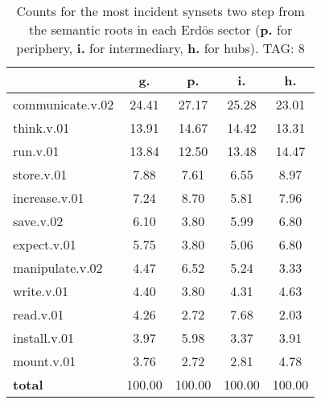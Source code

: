 \begin{table}[h!]
\begin{center}
\begin{tabular}{| l || c | c | c | c |}\hline
 & {\bf g.} & {\bf p.} & {\bf i.} & {\bf h.} \\\hline\hline
communicate.v.02 & 24.41  & 27.17  & 25.28  & 23.01 \\\hline
think.v.01 & 13.91  & 14.67  & 14.42  & 13.31 \\\hline
run.v.01 & 13.84  & 12.50  & 13.48  & 14.47 \\\hline
store.v.01 & 7.88  & 7.61  & 6.55  & 8.97 \\\hline
increase.v.01 & 7.24  & 8.70  & 5.81  & 7.96 \\\hline
save.v.02 & 6.10  & 3.80  & 5.99  & 6.80 \\\hline
expect.v.01 & 5.75  & 3.80  & 5.06  & 6.80 \\\hline
manipulate.v.02 & 4.47  & 6.52  & 5.24  & 3.33 \\\hline
write.v.01 & 4.40  & 3.80  & 4.31  & 4.63 \\\hline
read.v.01 & 4.26  & 2.72  & 7.68  & 2.03 \\\hline
install.v.01 & 3.97  & 5.98  & 3.37  & 3.91 \\\hline
mount.v.01 & 3.76  & 2.72  & 2.81  & 4.78 \\\hline\hline
{{\bf total}} & 100.00  & 100.00  & 100.00  & 100.00 \\\hline
\end{tabular}
\caption{Counts for the most incident synsets two step from the semantic roots in each Erd\"os sector ({\bf p.} for periphery, {\bf i.} for intermediary, {\bf h.} for hubs). TAG: 8}
\end{center}
\end{table}